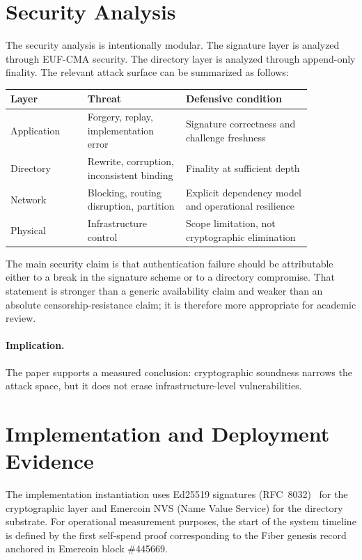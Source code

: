 \documentclass[11pt,a4paper]{article}
\begin{document}
\section{Security Analysis}

The security analysis is intentionally modular. The signature layer is analyzed through EUF-CMA security. The directory layer is analyzed through append-only finality. The relevant attack surface can be summarized as follows:

\begin{center}
\begin{tabular}{p{0.22\linewidth}p{0.28\linewidth}p{0.36\linewidth}}
\toprule
\textbf{Layer} & \textbf{Threat} & \textbf{Defensive condition} \\
\midrule
Application & Forgery, replay, implementation error & Signature correctness and challenge freshness \\
Directory & Rewrite, corruption, inconsistent binding & Finality at sufficient depth \\
Network & Blocking, routing disruption, partition & Explicit dependency model and operational resilience \\
Physical & Infrastructure control & Scope limitation, not cryptographic elimination \\
\bottomrule
\end{tabular}
\end{center}

The main security claim is that authentication failure should be attributable either to a break in the signature scheme or to a directory compromise. That statement is stronger than a generic availability claim and weaker than an absolute censorship-resistance claim; it is therefore more appropriate for academic review.

\paragraph{Implication.} The paper supports a measured conclusion: cryptographic soundness narrows the attack space, but it does not erase infrastructure-level vulnerabilities.

\section{Implementation and Deployment Evidence}

The implementation instantiation uses Ed25519 signatures (RFC~8032)~\cite{rfc8032} for the cryptographic layer and Emercoin NVS (Name Value Service) for the directory substrate. For operational measurement purposes, the start of the system timeline is defined by the first self-spend proof corresponding to the Fiber genesis record anchored in Emercoin block \#445669.
\end{document}
